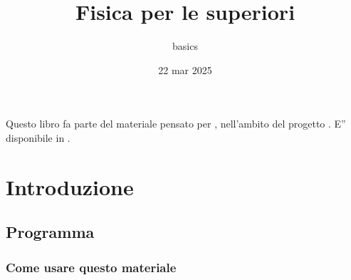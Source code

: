 \documentclass[letterpaper,10pt,italian]{jupyterBook}
\title{Fisica per le superiori}
\date{22 mar 2025}
\author{basics}
\begin{document}
\pagestyle{empty}
\sphinxmaketitle
\pagestyle{plain}
\sphinxtableofcontents
\pagestyle{normal}
\label{\detokenize{intro::doc}}


\sphinxAtStartPar
Questo libro fa parte del materiale pensato per , nell’ambito del progetto . E” disponibile in .





\sphinxstepscope


\part{Introduzione}

\sphinxstepscope


\chapter{Programma}
\label{\detokenize{ch/program:programma}}\label{\detokenize{ch/program:physics-hs-program}}\label{\detokenize{ch/program::doc}}

\section{Come usare questo materiale}
\label{\detokenize{ch/program:come-usare-questo-materiale}}
\end{document}
